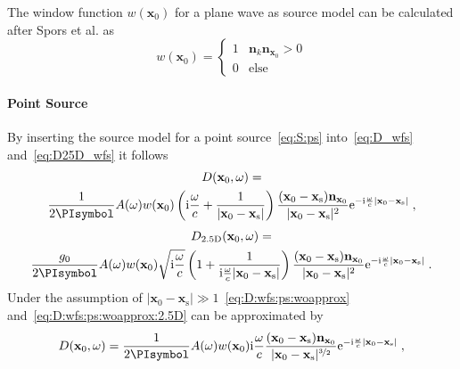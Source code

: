 \documentclass[a4paper]{book}
\newcommand{\reproduce}[1]{%
    \href{#1}{\color{link}\large\Pointinghand}%
}%
\newcommand{\ft}{\footnotesize}                                   %
\newcommand{\PI}{\PIsymbol}%
\newcommand{\I}{\mathrm{i}}                          %
\newcommand{\E}{\mathrm{e}}                          %
\renewcommand{\vec}[1]{\mathbf{#1}}                  %
\newcommand{\x}{\vec{x}}                             %
\newcommand{\xs}{\x_\text{s}}                        %
\newcommand{\xref}{\x_\text{ref}}                    %
\newcommand{\n}{\vec{n}}                             %
\newcommand{\omegac}{\frac{\omega}{c}}               %
\newcommand{\qc}{\;,}                                             %
\newcommand{\qp}{\;.}                                             %
\def \twohalfD {{2.5\text{D}}\xspace}                             %
\newcommand\eqlabel[2][]{%
  \label{eq:#2}%
}
\begin{document}
The window function $w(\x_0)$ for a plane wave as source model can be
calculated after Spors et al. as\cite{Spors2008}
%
\begin{equation}
    w(\x_0) = 
    \begin{cases}
        1 & \n_k \n_{\x_0} > 0 \\
        0 & \text{else}
    \end{cases}
    \eqlabel{wfs:pw:selection}
\end{equation}
%



\paragraph{Point Source}
%
By inserting the source model for a point
source~\eqref{eq:S:ps}
into~\eqref{eq:D_wfs} and~\eqref{eq:D25D_wfs} it follows
%
%    
%
\begin{multline}
    D(\x_0,\omega) = \\
    \frac{1}{2\PI} A(\omega) w(\x_0) \left(\I\omegac +
    \frac{1}{|\x_0-\xs|} \right) \frac{(\x_0-\xs)\n_{\x_0}}{|\x_0-\xs|^2}
    \E^{-\I\omegac |\x_0-\xs|} \qc
    \eqlabel{D:wfs:ps:woapprox}
\end{multline}
%
\begin{multline}
    D_\twohalfD(\x_0,\omega) = \\
    \frac{g_0}{2\PI} A(\omega) w(\x_0) \sqrt{\I\omegac} \left(
    1 + \frac{1}{\I\omegac|\x_0-\xs|}
    \right) \frac{(\x_0-\xs) \n_{\x_0}}{|\x_0-\xs|^2} \E^{-\I\omegac |\x_0-\xs|} \qp
    \eqlabel{D:wfs:ps:woapprox:2.5D}
\end{multline}
%
Under the assumption of $|\x_0-\xs| \gg
1$~\eqref{eq:D:wfs:ps:woapprox}
and~\eqref{eq:D:wfs:ps:woapprox:2.5D} can be approximated by
%
\begin{equation}
    D(\x_0,\omega) = \frac{1}{2\PI} A(\omega) w(\x_0) \I\omegac
    \frac{(\x_0-\xs)\n_{\x_0}}{|\x_0-\xs|^{\nicefrac{3}{2}}}
    \E^{-\I\omegac |\x_0-\xs|} \qc
    \eqlabel{D:wfs:ps}
\end{equation}
\end{document}

